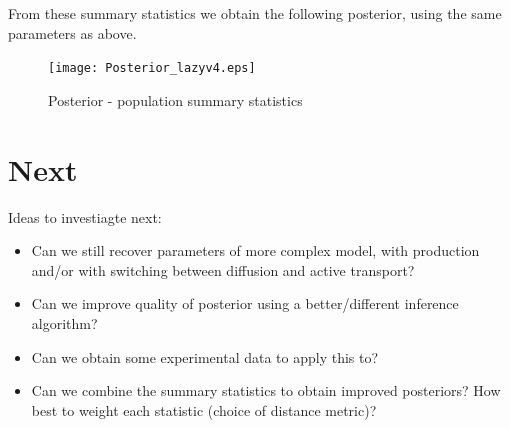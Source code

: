 \documentclass[a4paper,10pt]{article}
\begin{document}
From these summary statistics we obtain the following posterior, using the same parameters as above.

\begin{figure}[h!]
\centering
\texttt{[image: Posterior\_lazyv4.eps]}
\caption{Posterior - population summary statistics}
\label{prior}
\end{figure}

\section{Next}
Ideas to investiagte next:
\begin{itemize}
 \item Can we still recover parameters of more complex model, with production and/or with switching between diffusion and active transport?
 \item Can we improve quality of posterior using a better/different inference algorithm?
 \item Can we obtain some experimental data to apply this to?
 \item Can we combine the summary statistics to obtain improved posteriors? How best to weight each statistic (choice of distance metric)?
\end{itemize}
\end{document}
